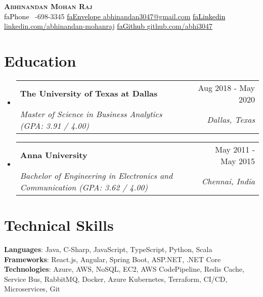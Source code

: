 \documentclass[letterpaper,12pt]{article}
\makeatletter
\newcommand{\resumeSubheading}[4]{
  \vspace{-2pt}\item
    \begin{tabular*}{0.97\textwidth}[t]{l@{\extracolsep{\fill}}r}
      \textbf{#1} & #2 \\
      \textit{\small#3} & \textit{\small #4} \\
    \end{tabular*}\vspace{-7pt}
}
\newcommand{\resumeSubHeadingListStart}{\begin{itemize}[leftmargin=0.15in, label={}]}
\newcommand{\resumeSubHeadingListEnd}{\end{itemize}}
\newcommand{\seticon}[1]{\textcolor{Black}{\csname #1\endcsname}}
\makeatother
\begin{document}
\begin{center}
    \textbf{\fontsize{11}{13.2}\selectfont \scshape Abhinandan Mohan Raj} \\ \vspace{1pt}
    \seticon{faPhone} \ \fontsize{11}{13.2}-698-3345 \quad
    \href{mailto:abhinandan3047@gmail.com}{\seticon{faEnvelope} \underline{\fontsize{11}{13.2}\selectfont abhinandan3047@gmail.com}} \quad
    \href{https://www.linkedin.com/in/abhinandan-mohanraj/}{\seticon{faLinkedin} \underline{\fontsize{11}{13.2}\selectfont linkedin.com/abhinandan-mohanraj}} \quad \quad \quad \quad \quad \quad \quad \quad \quad \quad \quad
    \href{https://github.com/abhi3047}{\seticon{faGithub} \underline{\fontsize{11}{13.2}\selectfont github.com/abhi3047}}
\end{center}

\section{Education}
    \resumeSubHeadingListStart

    \resumeSubheading
    {The University of Texas at Dallas}{Aug 2018 - May 2020}
    {Master of Science in Business Analytics (GPA: 3.91 / 4.00)}{Dallas, Texas}
    \resumeSubheading
    {Anna University}{May 2011 - May 2015}
    {Bachelor of Engineering in Electronics and Communication (GPA: 3.62 / 4.00)}{Chennai, India}
    \resumeSubHeadingListEnd

\section{Technical Skills}
    \begin{itemize}[leftmargin=0.15in, label={}]
	\small{\item{
		\textbf{Languages}{: Java, C-Sharp, JavaScript, TypeScript, Python, Scala} \\
		\textbf{Frameworks}{: React.js, Angular, Spring Boot, ASP.NET,  .NET Core } \\
		\textbf{Technologies}{: Azure, AWS, NoSQL, EC2, AWS CodePipeline, Redis  Cache, Service Bus, RabbitMQ, Docker, Azure Kubernetes, Terraform, CI/CD, Microservices, Git}
	}}
    \end{itemize}
\end{document}
